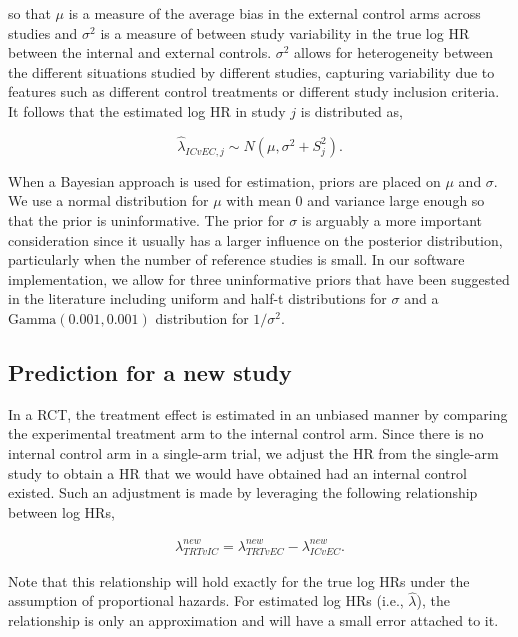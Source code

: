\documentclass[11pt,final,fleqn]{article}\usepackage[]{graphicx}\usepackage[]{color}
\begin{document}
so that $\mu$ is a measure of the average bias in the external control arms across studies and $\sigma^2$ is a measure of between study variability in the true log HR between the internal and external controls. $\sigma^2$ allows for heterogeneity between the different situations studied by different studies, capturing variability due to features such as different control treatments or different study inclusion criteria. It follows that the estimated log HR in study $j$ is distributed as,

\begin{equation}
\hat\lambda_{ICvEC,j} \sim N ( \mu , \sigma^2 + S_j^2).
\end{equation}

When a Bayesian approach is used for estimation, priors are placed on $\mu$ and $\sigma$. We use a normal distribution for $\mu$ with mean $0$ and variance large enough so that the prior is uninformative. The prior for $\sigma$ is arguably a more important consideration since it usually has a larger influence on the posterior distribution, particularly when the number of reference studies is small. In our software implementation, we allow for three uninformative priors that have been suggested in the literature including uniform \cite{gelman2013bayesian} and half-t \cite{gelman2006prior, polson2012half} distributions for $\sigma$ and a $\text{Gamma}(0.001, 0.001)$ distribution \cite{spiegelhalter2004bayesian} for $1/\sigma^2$.


\subsection{Prediction for a new study} \label{subsec:prediction}
In a RCT, the treatment effect is estimated in an unbiased manner by comparing the experimental treatment arm to the internal control arm. Since there is no internal control arm in a single-arm trial, we adjust the HR from the single-arm study to obtain a HR that we would have obtained had an internal control existed. Such an adjustment is made by leveraging the following relationship between log HRs,


\begin{align} \label{eqn:hr-relationship}
\lambda_{\textit{TRT}vIC}^{new} = \lambda_{\textit{TRT}vEC}^{new} - \lambda_{ICvEC}^{new}.
\end{align}

Note that this relationship will hold exactly for the true log HRs under the assumption of proportional hazards. For estimated log HRs (i.e., $\hat{\lambda}$), the relationship is only an approximation and will have a small error attached to it. 
\end{document}
